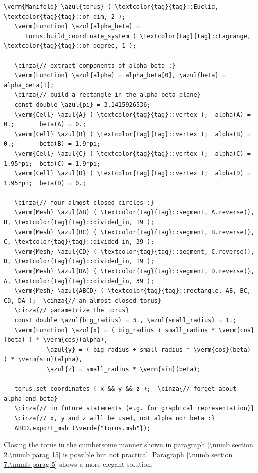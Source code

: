 \begin{Verbatim}[commandchars=\\\{\},formatcom=\small\tt,frame=single,
   label=parag-\ref{\numb section 2.\numb parag 16}.cpp,rulecolor=\color{coment},
   baselinestretch=0.94,framesep=2mm]
   \verm{Manifold} \azul{torus} ( \textcolor{tag}{tag}::Euclid, \textcolor{tag}{tag}::of_dim, 2 );
   \verm{Function} \azul{alpha_beta} =
      torus.build_coordinate_system ( \textcolor{tag}{tag}::Lagrange, \textcolor{tag}{tag}::of_degree, 1 );

   \cinza{// extract components of alpha_beta :}
   \verm{Function} \azul{alpha} = alpha_beta[0], \azul{beta} = alpha_beta[1];
   \cinza{// build a rectangle in the alpha-beta plane}
   const double \azul{pi} = 3.1415926536;
   \verm{Cell} \azul{A} ( \textcolor{tag}{tag}::vertex );  alpha(A) = 0.;       beta(A) = 0.;
   \verm{Cell} \azul{B} ( \textcolor{tag}{tag}::vertex );  alpha(B) = 0.;       beta(B) = 1.9*pi;
   \verm{Cell} \azul{C} ( \textcolor{tag}{tag}::vertex );  alpha(C) = 1.95*pi;  beta(C) = 1.9*pi;
   \verm{Cell} \azul{D} ( \textcolor{tag}{tag}::vertex );  alpha(D) = 1.95*pi;  beta(D) = 0.;

   \cinza{// four almost-closed circles :}
   \verm{Mesh} \azul{AB} ( \textcolor{tag}{tag}::segment, A.reverse(), B, \textcolor{tag}{tag}::divided_in, 19 );
   \verm{Mesh} \azul{BC} ( \textcolor{tag}{tag}::segment, B.reverse(), C, \textcolor{tag}{tag}::divided_in, 39 );
   \verm{Mesh} \azul{CD} ( \textcolor{tag}{tag}::segment, C.reverse(), D, \textcolor{tag}{tag}::divided_in, 19 );
   \verm{Mesh} \azul{DA} ( \textcolor{tag}{tag}::segment, D.reverse(), A, \textcolor{tag}{tag}::divided_in, 39 );
   \verm{Mesh} \azul{ABCD} ( \textcolor{tag}{tag}::rectangle, AB, BC, CD, DA );  \cinza{// an almost-closed torus}
   \cinza{// parametrize the torus}
   const double \azul{big_radius} = 3., \azul{small_radius} = 1.;
   \verm{Function} \azul{x} = ( big_radius + small_radius * \verm{cos}(beta) ) * \verm{cos}(alpha),
            \azul{y} = ( big_radius + small_radius * \verm{cos}(beta) ) * \verm{sin}(alpha),
            \azul{z} = small_radius * \verm{sin}(beta);

   torus.set_coordinates ( x && y && z );  \cinza{// forget about alpha and beta}
   \cinza{// in future statements (e.g. for graphical representation)}
   \cinza{// x, y and z will be used, not alpha nor beta :}
   ABCD.export_msh (\verde{"torus.msh"});
\end{Verbatim}

Closing the torus in the cumbersome manner shown in paragraph
\ref{\numb section 2.\numb parag 15} is possible but not practical.
Paragraph \ref{\numb section 7.\numb parag 5} shows a more elegant solution.

